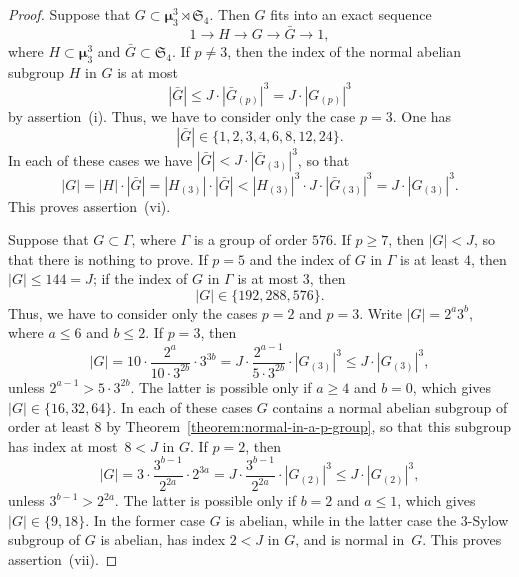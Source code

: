 \documentclass[10pt,a4paper]{amsart}
\def \ge {\geqslant}
\def \le {\leqslant}
\newcommand{\mumu}{\boldsymbol{\mu}}
\begin{document}
\begin{proof}
Suppose that $G\subset\mumu_3^3\rtimes \mathfrak{S}_4$.
Then $G$ fits into
an exact sequence
$$
1\to H\to G\to\bar{G}\to 1,
$$
where $H\subset \mumu_3^3$ and $\bar{G}\subset\mathfrak{S}_4$.
If $p\neq 3$, then the index of the normal abelian subgroup $H$ in $G$
is at most
$$
|\bar{G}|\le J\cdot |\bar{G}_{(p)}|^3=J\cdot |G_{(p)}|^3
$$
by assertion~(i).
Thus, we have to consider only the case $p=3$.
One has
$$
|\bar{G}|\in\{1,2,3,4,6,8,12,24\}.
$$
In each of these cases we have $|\bar{G}|< J\cdot |\bar{G}_{(3)}|^3$,
so that
$$
|G|=|H|\cdot |\bar{G}|=|H_{(3)}|\cdot |\bar{G}|< |H_{(3)}|^3\cdot J\cdot |\bar{G}_{(3)}|^3=
J\cdot |G_{(3)}|^3.
$$
This proves assertion~(vi).

Suppose that $G\subset\Gamma$, where $\Gamma$ is a group of order $576$.
If $p\ge 7$, then $|G|<J$, so that there is nothing to prove.
If $p=5$ and the index of $G$ in $\Gamma$ is at least $4$, then $|G|\le 144=J$;
if the index of $G$ in $\Gamma$ is at most $3$, then
$$
|G|\in\{192,288,576\}.
$$
Thus, we have to consider only the cases $p=2$ and $p=3$.
Write $|G|=2^a3^b$, where $a\le 6$ and $b\le 2$. If
$p=3$, then
$$
|G|=10\cdot \frac{2^a}{10\cdot 3^{2b}}\cdot 3^{3b}=
J\cdot \frac{2^{a-1}}{5\cdot 3^{2b}}\cdot |G_{(3)}|^3\le J\cdot |G_{(3)}|^3,
$$
unless $2^{a-1}>5\cdot 3^{2b}$. The latter is possible only if $a\ge 4$ and $b=0$, which
gives~\mbox{$|G|\in\{16,32,64\}$}. In each of these cases $G$ contains a normal abelian subgroup of
order at least $8$ by Theorem~\ref{theorem:normal-in-a-p-group}, so that this
subgroup has index at most~\mbox{$8<J$} in $G$.
If $p=2$, then
$$
|G|=3\cdot \frac{3^{b-1}}{2^{2a}}\cdot 2^{3a}=
J\cdot \frac{3^{b-1}}{2^{2a}}\cdot |G_{(2)}|^3\le J\cdot |G_{(2)}|^3,
$$
unless $3^{b-1}>2^{2a}$. The latter is possible only if $b=2$ and $a\le 1$, which
gives~\mbox{$|G|\in\{9,18\}$}. In the former case $G$ is abelian, while in the latter
case the $3$-Sylow subgroup of $G$ is abelian, has index $2<J$ in $G$, and is normal
in~$G$. This proves assertion~(vii).
\end{proof}
\end{document}
